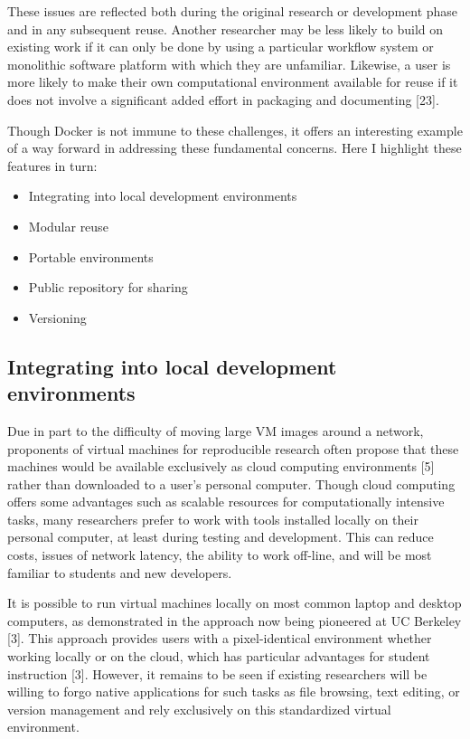 \documentclass[9pt]{components/acm_proc_article-sp}
\begin{document}
These issues are reflected both during the original research or
development phase and in any subsequent reuse. Another researcher may be
less likely to build on existing work if it can only be done by using a
particular workflow system or monolithic software platform with which
they are unfamiliar. Likewise, a user is more likely to make their own
computational environment available for reuse if it does not involve a
significant added effort in packaging and documenting {[}23{]}.

Though Docker is not immune to these challenges, it offers an
interesting example of a way forward in addressing these fundamental
concerns. Here I highlight these features in turn:

\begin{itemize}
\itemsep1pt\parskip0pt
\item
  Integrating into local development environments
\item
  Modular reuse
\item
  Portable environments
\item
  Public repository for sharing
\item
  Versioning
\end{itemize}

\subsection{Integrating into local development
environments}\label{integrating-into-local-development-environments}

Due in part to the difficulty of moving large VM images around a
network, proponents of virtual machines for reproducible research often
propose that these machines would be available exclusively as cloud
computing environments {[}5{]} rather than downloaded to a user's
personal computer. Though cloud computing offers some advantages such as
scalable resources for computationally intensive tasks, many researchers
prefer to work with tools installed locally on their personal computer,
at least during testing and development. This can reduce costs, issues
of network latency, the ability to work off-line, and will be most
familiar to students and new developers.

It is possible to run virtual machines locally on most common laptop and
desktop computers, as demonstrated in the approach now being pioneered
at UC Berkeley {[}3{]}. This approach provides users with a
pixel-identical environment whether working locally or on the cloud,
which has particular advantages for student instruction {[}3{]}.
However, it remains to be seen if existing researchers will be willing
to forgo native applications for such tasks as file browsing, text
editing, or version management and rely exclusively on this standardized
virtual environment.
\end{document}
